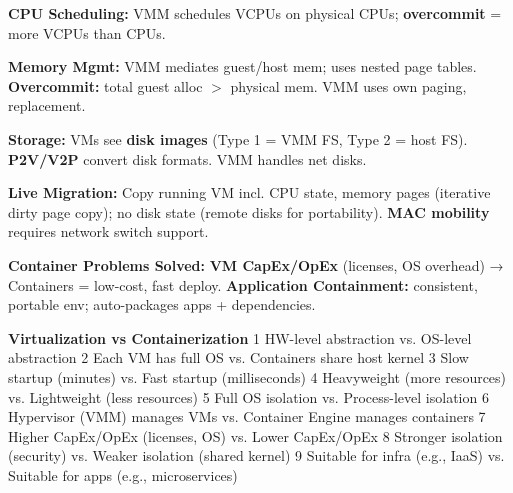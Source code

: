 \textbf{CPU Scheduling:} VMM schedules VCPUs on physical CPUs; \textbf{overcommit} = more VCPUs than CPUs.

\textbf{Memory Mgmt:} VMM mediates guest/host mem; uses nested page tables. \textbf{Overcommit:} total guest alloc $>$ physical mem. VMM uses own paging, replacement.

\textbf{Storage:} VMs see \textbf{disk images} (Type 1 = VMM FS, Type 2 = host FS). \textbf{P2V/V2P} convert disk formats. VMM handles net disks.

\textbf{Live Migration:} Copy running VM incl. CPU state, memory pages (iterative dirty page copy); no disk state (remote disks for portability). \textbf{MAC mobility} requires network switch support.

\textbf{Container Problems Solved:} \textbf{VM CapEx/OpEx} (licenses, OS overhead) → Containers = low-cost, fast deploy. \textbf{Application Containment:} consistent, portable env; auto-packages apps + dependencies.

\textbf{Virtualization vs Containerization}
1 HW-level abstraction vs. OS-level abstraction
2 Each VM has full OS vs. Containers share host kernel
3 Slow startup (minutes) vs. Fast startup (milliseconds)
4 Heavyweight (more resources) vs. Lightweight (less resources)
5 Full OS isolation vs. Process-level isolation
6 Hypervisor (VMM) manages VMs vs. Container Engine manages containers
7 Higher CapEx/OpEx (licenses, OS) vs. Lower CapEx/OpEx
8 Stronger isolation (security) vs. Weaker isolation (shared kernel)
9 Suitable for infra (e.g., IaaS) vs. Suitable for apps (e.g., microservices)